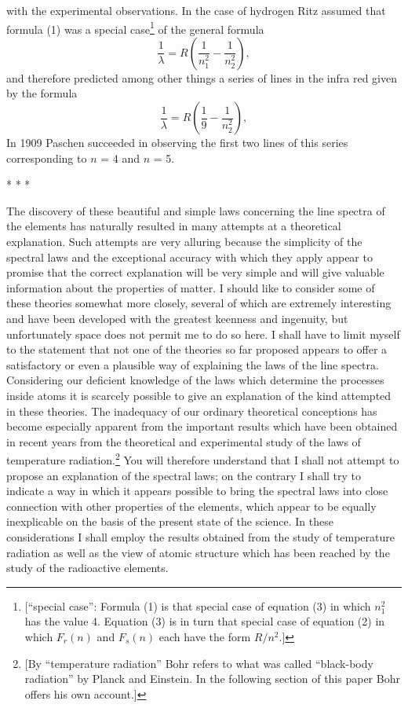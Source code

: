 with the experimental observations. In the case of hydrogen Ritz assumed
that formula (1) was a special case\footnote{{[}``special case'':
  Formula (1) is that special case of equation (3) in which $n_1^2$
  has the value 4. Equation (3) is in turn that special case of equation
  (2) in which $F_r(n)$ and $F_s(n)$ each have
  the form $R/n^2$.]} of the general formula
%
\begin{equation}
\frac{1}{\lambda} = R\left(\frac{1}{n_1^2} - \frac{1}{n_2^2}\right) ,
\end{equation}
%
and therefore predicted among other things a series of lines in the
infra red given by the formula
%
\begin{equation*}
\frac{1}{\lambda} = R\left(\frac{1}{9} - \frac{1}{n_2^2}\right) ,
\end{equation*}
%
In 1909 Paschen succeeded in observing the first two lines of this
series corresponding to $n$ = 4 and $n$ = 5.\\
\centerline{* * *}
%
The discovery of these beautiful and simple laws concerning the line
spectra of the elements has naturally resulted in many attempts at a
theoretical explanation. Such attempts are very alluring because the
simplicity of the spectral laws and the exceptional accuracy with which
they apply appear to promise that the correct explanation will be very
simple and will give valuable information about the properties of
matter. I should like to consider some of these theories somewhat more
closely, several of which are extremely interesting and have been
developed with the greatest keenness and ingenuity, but unfortunately
space does not permit me to do so here. I shall have to limit myself to
the statement that not one of the theories so far proposed appears to
offer a satisfactory or even a plausible way of explaining the laws of
the line spectra. Considering our deficient knowledge of the laws which
determine the processes inside atoms it is scarcely possible to give an
explanation of the kind attempted in these theories. The inadequacy of
our ordinary theoretical conceptions has become especially apparent from
the important results which have been obtained in recent years from the
theoretical and experimental study of the laws of temperature
radiation.\footnote{{[}By ``temperature radiation'' Bohr refers to what
  was called ``black-body radiation'' by Planck and Einstein. In the
  following section of this paper Bohr offers his own account.{]}} You
will therefore understand that I shall not attempt to propose an
explanation of the spectral laws; on the contrary I shall try to
indicate a way in which it appears possible to bring the spectral laws
into close connection with other properties of the elements, which
appear to be equally inexplicable on the basis of the present state of
the science. In these considerations I shall employ the results obtained
from the study of temperature radiation as well as the view of atomic
structure which has been reached by the study of the radioactive
elements.

